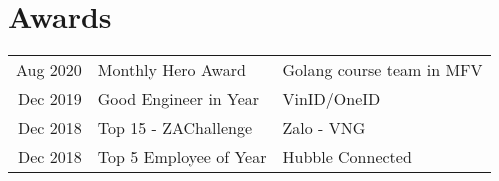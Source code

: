 \documentclass[]{deedy-resume-openfont}
\begin{document}
\begin{minipage}[t]{0.69\textwidth}


\section{Awards} 
\begin{tabular}{rll}
Aug 2020	     &  Monthly Hero Award & Golang course team in MFV \\
Dec 2019	     & Good Engineer in Year  & VinID/OneID \\
Dec 2018	     & Top 15 - ZAChallenge  & Zalo - VNG\\
Dec 2018         & Top 5 Employee of Year & Hubble Connected \\
\end{tabular}
\sectionsep


% 
% 

\end{minipage} 
\end{document}
